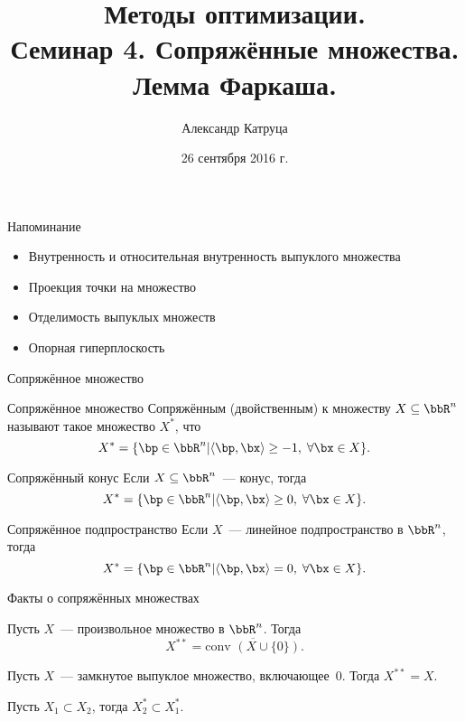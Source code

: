 \documentclass[12pt]{beamer}
\title[Семинар 4]{Методы оптимизации. \\
 Семинар 4. Сопряжённые множества. Лемма Фаркаша.}
\author{Александр Катруца}
\institute{Московский физико-технический институт,\\
Факультет Управления и Прикладной Математики}
\date{26 сентября 2016 г.}
\begin{document}
\begin{frame}
\maketitle
\end{frame}

\begin{frame}{Напоминание}
\begin{itemize}
\item Внутренность и относительная внутренность выпуклого множества
\item Проекция точки на множество
\item Отделимость выпуклых множеств
\item Опорная гиперплоскость
\end{itemize}
\end{frame}

\begin{frame}{Сопряжённое множество}
\begin{block}{Сопряжённое множество}
Сопряжённым (двойственным) к множеству $X \subseteq \bbR^n$ называют такое множество $X^*$, что
\vspace{-4mm}
\[
X^* = \{ \bp \in \bbR^n | \langle \bp, \bx \rangle \geq -1, \; \forall \bx \in X \}.
\]
\end{block}

\begin{block}{Сопряжённый конус}
Если $X \subseteq \bbR^n$~--- конус, тогда
\vspace{-4mm} 
\[
X^* = \{ \bp \in \bbR^n | \langle \bp, \bx \rangle \geq 0, \; \forall \bx \in X \}.
\]
\end{block}

\begin{block}{Сопряжённое подпространство}
Если $X$~--- линейное подпространство в $\bbR^n$, тогда 
\vspace{-4mm} 
\[
X^* = \{ \bp \in \bbR^n | \langle \bp, \bx \rangle = 0, \; \forall \bx \in X \}.
\]
\end{block}
\end{frame}

\begin{frame}{Факты о сопряжённых множествах}
\begin{theorem}
Пусть $X$~--- произвольное множество в $\bbR^n$. Тогда
\vspace{-4mm}
\[
X^{**} = \overline{\text{conv }(X \cup \{0\})}.
\] 
\end{theorem}

\begin{theorem}
Пусть $X$~--- замкнутое выпуклое множество, включающее~0. Тогда $X^{**} = X$.
\end{theorem}

\begin{theorem}
Пусть $X_1 \subset X_2$, тогда $X^*_2 \subset X^*_1$.
\end{theorem}
\end{frame}
\end{document}
